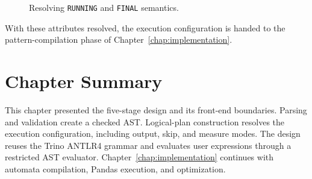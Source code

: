 \begin{figure}[H]
  \caption{Resolving \texttt{RUNNING} and \texttt{FINAL} semantics.}
  \label{fig:measure-sem-resolution}
\end{figure}

With these attributes resolved, the execution configuration is handed
to the pattern-compilation phase of Chapter~\ref{chap:implementation}.

\section{Chapter Summary}
\label{sec:meth-summary}

This chapter presented the five-stage design and its front-end
boundaries.  Parsing and validation create a checked AST.  Logical-plan
construction resolves the execution configuration, including output,
skip, and measure modes.  The design reuses the Trino ANTLR4 grammar
and evaluates user expressions through a restricted AST evaluator.
Chapter~\ref{chap:implementation} continues with automata compilation,
Pandas execution, and optimization.
